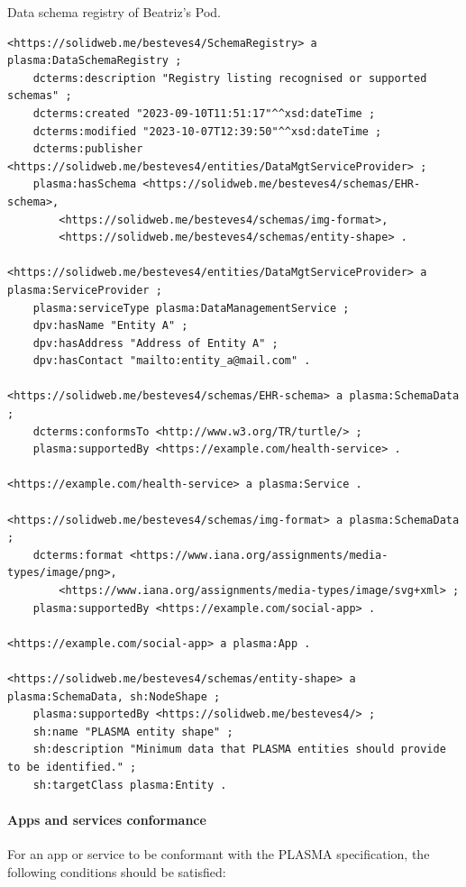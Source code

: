 \begin{listing}[htp]
\caption{Data schema registry of Beatriz's Pod.}
\label{list:plasma_dataschemaregistry}
\begin{verbatim}
<https://solidweb.me/besteves4/SchemaRegistry> a plasma:DataSchemaRegistry ;
    dcterms:description "Registry listing recognised or supported schemas" ;
    dcterms:created "2023-09-10T11:51:17"^^xsd:dateTime ;
    dcterms:modified "2023-10-07T12:39:50"^^xsd:dateTime ;
    dcterms:publisher <https://solidweb.me/besteves4/entities/DataMgtServiceProvider> ;
    plasma:hasSchema <https://solidweb.me/besteves4/schemas/EHR-schema>,
        <https://solidweb.me/besteves4/schemas/img-format>,
        <https://solidweb.me/besteves4/schemas/entity-shape> .

<https://solidweb.me/besteves4/entities/DataMgtServiceProvider> a plasma:ServiceProvider ;
    plasma:serviceType plasma:DataManagementService ;
    dpv:hasName "Entity A" ;
    dpv:hasAddress "Address of Entity A" ;
    dpv:hasContact "mailto:entity_a@mail.com" .

<https://solidweb.me/besteves4/schemas/EHR-schema> a plasma:SchemaData ;
    dcterms:conformsTo <http://www.w3.org/TR/turtle/> ;
    plasma:supportedBy <https://example.com/health-service> .

<https://example.com/health-service> a plasma:Service .

<https://solidweb.me/besteves4/schemas/img-format> a plasma:SchemaData ;
    dcterms:format <https://www.iana.org/assignments/media-types/image/png>,
        <https://www.iana.org/assignments/media-types/image/svg+xml> ;
    plasma:supportedBy <https://example.com/social-app> .

<https://example.com/social-app> a plasma:App .

<https://solidweb.me/besteves4/schemas/entity-shape> a plasma:SchemaData, sh:NodeShape ;
    plasma:supportedBy <https://solidweb.me/besteves4/> ;
    sh:name "PLASMA entity shape" ;
    sh:description "Minimum data that PLASMA entities should provide to be identified." ;
    sh:targetClass plasma:Entity .
\end{verbatim}
\end{listing}

\paragraph{Apps and services conformance}
For an app or service to be conformant with the PLASMA specification, the following conditions should be satisfied:

